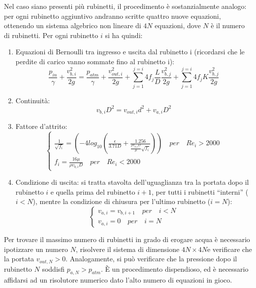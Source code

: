\documentclass[oneside]{article}
\begin{document}
Nel caso siano presenti più rubinetti, il procedimento è sostanzialmente analogo: per
ogni rubinetto aggiuntivo andranno scritte quattro nuove equazioni, ottenendo un sistema
algebrico non lineare di $4N$ equazioni, dove $N$ è il numero di rubinetti. Per ogni
rubinetto $i$ si ha quindi:
\begin{enumerate}
   \item Equazioni di Bernoulli tra ingresso e uscita dal rubinetto i (ricordarsi che le
      perdite di carico vanno sommate fino al rubinetto i):
      \begin{equation*}
         \frac{p_{in}}{\gamma} + \frac{v_{b,i}^{2}}{2g} = \frac{p_{atm}}{\gamma} +
         \frac{v_{out,i}^{2}}{2g} + \sum_{j = 1}^{j =
         i}4f_{j}\frac{L}{D}\frac{v_{b,j}^{2}}{2g} + \sum_{j = 1}^{j = i}4f_{j}
         K\frac{v_{b,j}^{2}}{2g}
      \end{equation*}

   \item Continuità:
      \begin{equation*}
         v_{b,i}D^{2} = v_{out,i}d^{2} + v_{a,i}D^{2}
      \end{equation*}

   \item Fattore d'attrito:
      \begin{equation*}
         \begin{cases}
            \frac{1}{\sqrt{f_{i}}} =
            \left(-4log_{10}\left(\frac{\epsilon}{3.71D}+\frac{1.256}{\frac{\rho
            v_{b,i}D}{\mu}\sqrt{f_{i}}}\right)\right) \quad per \quad Re_{i} > 2000 \\
            f_{i} = \frac{16 \mu}{\rho v_{b,i}D} \quad per \quad Re_{i} < 2000
         \end{cases}
      \end{equation*}

   \item Condizione di uscita: si tratta stavolta dell’uguaglianza tra la portata dopo il
      rubinetto $i$ e quella prima del rubinetto $i + 1$, per tutti i rubinetti “interni”
      ($i < N$), mentre la condizione di chiusura per l’ultimo rubinetto ($i = N$):
      \begin{equation*}
         \begin{cases}
            v_{a,i} = v_{b,i+1} \quad per \quad i < N \\
            v_{a,i} = 0 \quad per \quad i = N
         \end{cases}
      \end{equation*}
\end{enumerate}

Per trovare il massimo numero di rubinetti in grado di erogare acqua è necessario
ipotizzare un numero $N$, risolvere il sistema di dimensione $4N\times4N$e verificare che
la portata $v_{out,N}>0$. Analogamente, si può verificare che la pressione dopo il
rubinetto $N$ soddisfi $p_{a,N}>p_{atm}$. È un procedimento dispendioso, ed è necessario
affidarsi ad un risolutore numerico dato l’alto numero di equazioni in gioco.
\end{document}
